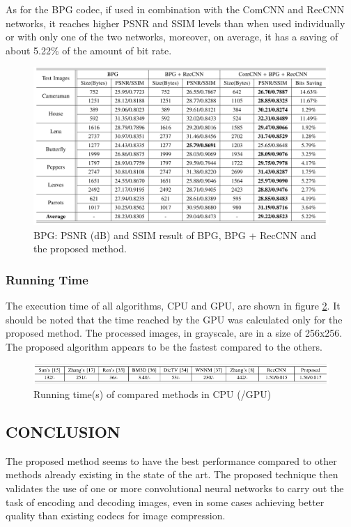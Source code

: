 As for the BPG codec, 
if used in combination with the ComCNN and RecCNN networks, it reaches 
higher PSNR and SSIM levels than when used individually or with only one 
of the two networks, moreover, on average, it has a saving of about 5.22\% of 
the amount of bit rate.
\begin{figure}[htbp]
    \centering
    \includegraphics[width = 1 \linewidth]{images/paper3/BPG.png}
    \centering
    \caption{BPG: PSNR (dB) and SSIM result of BPG, BPG + RecCNN and the proposed method.}
    \label{fig:BPG}
\end{figure}

\subsubsection{Running Time}
The execution time of all algorithms, CPU and GPU, are shown in figure \ref{fig:time}. 
It should be noted that the time reached by the GPU was calculated only 
for the proposed method. The processed images, in grayscale, are in a size 
of 256x256. The proposed algorithm appears to be the fastest compared to 
the others.
\begin{figure}[htbp]
    \centering
    \includegraphics[width = 1 \linewidth]{images/paper3/time.png}
    \centering
    \caption{Running time(s) of compared methods in CPU (/GPU) }
    \label{fig:time}
\end{figure}

\subsection{CONCLUSION}
The proposed method seems to have the best performance compared to other 
methods already existing in the state of the art. The proposed technique 
then validates the use of one or more convolutional neural networks to carry 
out the task of encoding and decoding images, even in some cases achieving 
better quality than existing codecs for image compression.